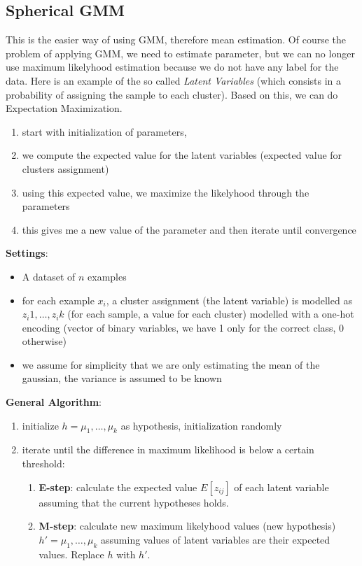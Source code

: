         \subsection{Spherical GMM}
            This is the easier way of using GMM, therefore mean estimation. Of course the problem of applying GMM, we need to estimate parameter, but we can no longer use maximum likelyhood estimation because we do not have any label for the data. 
            Here is an example of the so called \textit{Latent Variables} (which consists in a probability of assigning the sample to each cluster). Based on this, we can do Expectation Maximization.
            \begin{enumerate}
                \item start with initialization of parameters, 
                \item we compute the expected value for the latent variables (expected value for clusters assignment)
                \item using this expected value, we maximize the likelyhood through the parameters
                \item this gives me a new value of the parameter and then iterate until convergence
            \end{enumerate}
            

            \textbf{Settings}:
            \begin{itemize}
                \item A dataset of $n$ examples
                \item for each example $x_i$, a cluster assignment (the latent variable) is modelled as $z_i1, \dots, z_ik$ (for each sample, a value for each cluster) modelled with a one-hot encoding (vector of binary variables, we have 1 only for the correct class, 0 otherwise)
                \item we assume for simplicity that we are only estimating the mean of the gaussian, the variance is assumed to be known
            \end{itemize}
            

            \textbf{General Algorithm}:
            \begin{enumerate}
                \item initialize $h = {\mu_1, \dots, \mu_k}$ as hypothesis, initialization randomly
                \item iterate until the difference in maximum likelihood is below a certain threshold:
                \begin{enumerate}
                    \item \textbf{E-step}: calculate the expected value $E[z_{ij}]$ of each latent variable assuming that the current hypotheses holds.
                    \item \textbf{M-step}: calculate new maximum likelyhood values (new hypothesis) $h' = {\mu_1, \dots, \mu_k}$ assuming values of latent variables are their expected values. Replace $h$ with $h'$.
                \end{enumerate}
            \end{enumerate}
            

